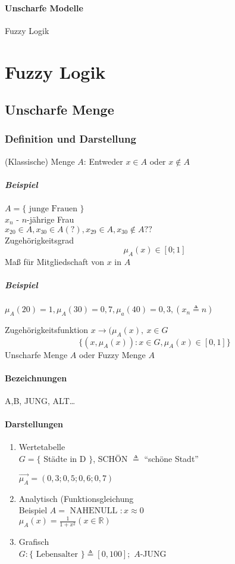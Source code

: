 \documentclass[a4paper]{scrartcl}
\begin{document}
\paragraph{Unscharfe Modelle} Fuzzy Logik

\section{Fuzzy Logik}
\subsection{Unscharfe Menge}
\subsubsection{Definition und Darstellung}
(Klassische) Menge $A$: Entweder $x \in A$ oder $x \notin A$
\subparagraph{Beispiel} $A= \{ \text{ junge Frauen } \}$\\
$x_n$ - $n$-jährige Frau\\
$x_{20} \in A, x_{30} \in A (?), x_{29} \in A, x_{30} \notin A ??$\\
Zugehörigkeitsgrad
\begin{equation} \mu_A (x) \in [0;1] \end{equation}
Maß für Mitgliedschaft von $x$ in $A$

\subparagraph{Beispiel} $\mu_A(20) = 1, \mu_A(30) = 0,7 , \mu_a(40) = 0,3, (x_n \triangleq n )$

Zugehörigkeitsfunktion $x \rightarrow (\mu_A (x),\: x \in G$
\[ \{ (x,\mu_A(x)) : x \in G, \mu_A(x) \in [0,1] \} \]
Unscharfe Menge $A$ oder Fuzzy Menge $A$
\paragraph{Bezeichnungen} A,B, JUNG, ALT\dots
\paragraph{Darstellungen}
\begin{enumerate}
	\item Wertetabelle \\
	$G = \{$ Städte in D $\}$, SCHÖN $\triangleq$ "`schöne Stadt"'

	$\vec{\mu_A} = (0,3;0,5;0,6;0,7)$
	\item Analytisch (Funktionsgleichung\\
	Beispiel $A= \text{ NAHENULL } : x \approx 0$\\
	$\mu_A (x) = \frac{1}{1+x^2} (x \in \mathbb{R})$
	\item Grafisch\\
	$G: \{ \text{ Lebensalter } \} \triangleq [0,100];$ $A$-JUNG
\end{enumerate}
\end{document}
